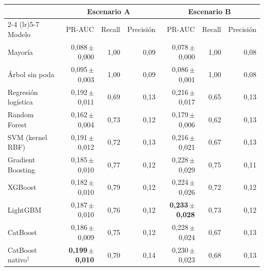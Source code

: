 \begin{tabular}{lrrrrrr}
\toprule
 & \multicolumn{3}{c}{Escenario A} & \multicolumn{3}{c}{Escenario B} \\
\cmidrule(lr){2-4} \cmidrule(lr){5-7}
Modelo & PR-AUC & Recall & Precisión & PR-AUC & Recall & Precisión \\
\midrule
Mayoría & 0{,}088\,\scriptsize$\pm$0{,}000 & 1{,}00 & 0{,}09 & 0{,}078\,\scriptsize$\pm$0{,}000 & 1{,}00 & 0{,}08 \\
Árbol sin poda & 0{,}095\,\scriptsize$\pm$0{,}003 & 1{,}00 & 0{,}09 & 0{,}086\,\scriptsize$\pm$0{,}001 & 1{,}00 & 0{,}08 \\
\midrule
Regresión logística & 0{,}192\,\scriptsize$\pm$0{,}011 & 0{,}69 & 0{,}13 & 0{,}216\,\scriptsize$\pm$0{,}017 & 0{,}65 & 0{,}13 \\
Random Forest & 0{,}162\,\scriptsize$\pm$0{,}004 & 0{,}73 & 0{,}12 & 0{,}179\,\scriptsize$\pm$0{,}006 & 0{,}62 & 0{,}13 \\
SVM (kernel RBF) & 0{,}191\,\scriptsize$\pm$0{,}012 & 0{,}72 & 0{,}13 & 0{,}216\,\scriptsize$\pm$0{,}021 & 0{,}67 & 0{,}13 \\
Gradient Boosting & 0{,}185\,\scriptsize$\pm$0{,}010 & 0{,}77 & 0{,}12 & 0{,}228\,\scriptsize$\pm$0{,}029 & 0{,}75 & 0{,}11 \\
XGBoost & 0{,}182\,\scriptsize$\pm$0{,}010 & 0{,}79 & 0{,}12 & 0{,}224\,\scriptsize$\pm$0{,}026 & 0{,}72 & 0{,}12 \\
LightGBM & 0{,}187\,\scriptsize$\pm$0{,}010 & 0{,}76 & 0{,}12 & \textbf{0{,}233\,\scriptsize$\pm$0{,}028} & 0{,}73 & 0{,}12 \\
CatBoost & 0{,}186\,\scriptsize$\pm$0{,}009 & 0{,}75 & 0{,}12 & 0{,}228\,\scriptsize$\pm$0{,}024 & 0{,}67 & 0{,}13 \\
CatBoost nativo$^{\dagger}$ & \textbf{0{,}199\,\scriptsize$\pm$0{,}010} & 0{,}70 & 0{,}14 & 0{,}230\,\scriptsize$\pm$0{,}023 & 0{,}68 & 0{,}13 \\
\bottomrule
\end{tabular}
